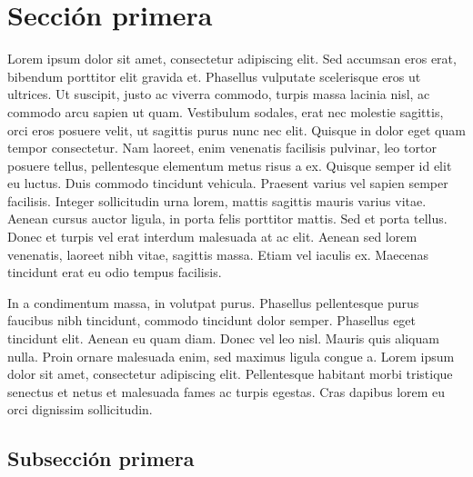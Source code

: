 \documentclass[a4paper, twoside]{article}
\begin{document}
\maketitle %

\tableofcontents %



\section{Sección primera}

Lorem ipsum dolor sit amet, consectetur adipiscing elit. Sed accumsan eros erat, bibendum porttitor elit gravida et. Phasellus vulputate scelerisque eros ut ultrices. Ut suscipit, justo ac viverra commodo, turpis massa lacinia nisl, ac commodo arcu sapien ut quam. Vestibulum sodales, erat nec molestie sagittis, orci eros posuere velit, ut sagittis purus nunc nec elit. Quisque in dolor eget quam tempor consectetur. Nam laoreet, enim venenatis facilisis pulvinar, leo tortor posuere tellus, pellentesque elementum metus risus a ex. Quisque semper id elit eu luctus. Duis commodo tincidunt vehicula. Praesent varius vel sapien semper facilisis. Integer sollicitudin urna lorem, mattis sagittis mauris varius vitae. Aenean cursus auctor ligula, in porta felis porttitor mattis. Sed et porta tellus. Donec et turpis vel erat interdum malesuada at ac elit. Aenean sed lorem venenatis, laoreet nibh vitae, sagittis massa. Etiam vel iaculis ex. Maecenas tincidunt erat eu odio tempus facilisis.

In a condimentum massa, in volutpat purus. Phasellus pellentesque purus faucibus nibh tincidunt, commodo tincidunt dolor semper. Phasellus eget tincidunt elit. Aenean eu quam diam. Donec vel leo nisl. Mauris quis aliquam nulla. Proin ornare malesuada enim, sed maximus ligula congue a. Lorem ipsum dolor sit amet, consectetur adipiscing elit. Pellentesque habitant morbi tristique senectus et netus et malesuada fames ac turpis egestas. Cras dapibus lorem eu orci dignissim sollicitudin. 

\subsection{Subsección primera}
\end{document}
